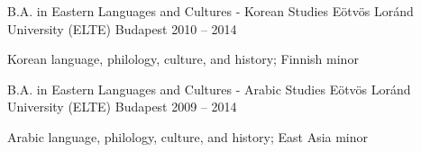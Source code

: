 \begin{cventries}
  \cventry
    {B.A. in Eastern Languages and Cultures - Korean Studies} %
    {Eötvös Loránd University (ELTE)} %
    {Budapest} %
    {2010 -- 2014} %
    {
      \begin{cvitems} %
        \item {Korean language, philology, culture, and history; Finnish minor}
      \end{cvitems}
    }

  \cventry
    {B.A. in Eastern Languages and Cultures - Arabic Studies} %
    {Eötvös Loránd University (ELTE)} %
    {Budapest} %
    {2009 -- 2014} %
    {
      \begin{cvitems} %
        \item {Arabic language, philology, culture, and history; East Asia minor}
      \end{cvitems}
    }

\end{cventries}
